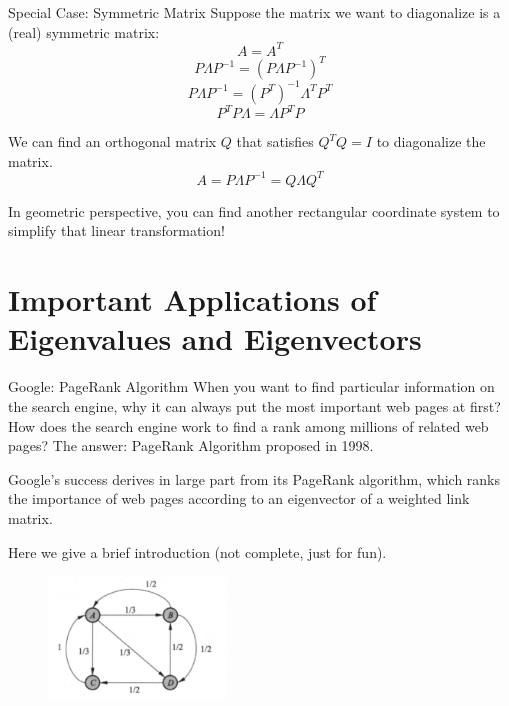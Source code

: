 \documentclass{beamer}
\begin{document}
\begin{frame}{Special Case: Symmetric Matrix}
Suppose the matrix we want to diagonalize is a (real) symmetric matrix:
\begin{equation*}
    A=A^T
\end{equation*}
\begin{equation*}
    P\varLambda P^{-1}=\left( P\varLambda P^{-1} \right) ^T
\end{equation*}
\begin{equation*}
    P\varLambda P^{-1}=\left( P^T \right) ^{-1}\varLambda ^TP^T
\end{equation*}
\begin{equation*}
    P^TP\varLambda =\varLambda P^TP
\end{equation*}

We can find an orthogonal matrix $Q$ that satisfies $Q^TQ=I$ to diagonalize the matrix.
\begin{equation*}
    A=P\varLambda P^{-1}=Q\varLambda Q^{T}
\end{equation*}

In geometric perspective, you can find another rectangular coordinate system to simplify that linear transformation!
\end{frame}

\section{Important Applications of Eigenvalues and Eigenvectors}
\begin{frame}{Google: PageRank Algorithm}
When you want to find particular information on the search engine, why it can always put the most important web pages at first? How does the search engine work to find a rank among millions of related web pages? The answer: PageRank Algorithm proposed in 1998.

\vspace{3pt}
Google’s success derives in large part from its PageRank algorithm, which ranks the importance of web pages according to an eigenvector of a weighted link matrix.

\vspace{3pt}
Here we give a brief introduction (not complete, just for fun).

\begin{figure}
    \centering
    \includegraphics[width=0.42\textwidth]{pr.png}
\end{figure}
\end{frame}
\end{document}
